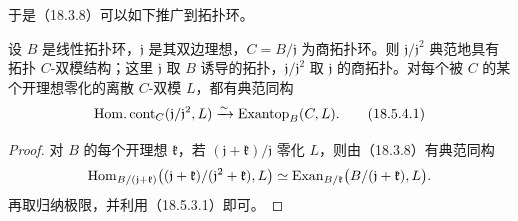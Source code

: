 于是（18.3.8）可以如下推广到拓扑环。

设 $B$ 是线性拓扑环，$\mathfrak j$ 是其双边理想，$C=B/\mathfrak j$ 为商拓扑环。则 $\mathfrak j/\mathfrak j^2$ 典范地具有拓扑 $C$-双模结构；这里 $\mathfrak j$ 取 $B$ 诱导的拓扑，$\mathfrak j/\mathfrak j^2$ 取 $\mathfrak j$ 的商拓扑。对每个被 $C$ 的某个开理想零化的离散 $C$-双模 $L$，都有典范同构
\begin{equation}
 \operatorname{Hom.cont}_C(\mathfrak j/\mathfrak j^2,L)
 \xrightarrow{\sim}\operatorname{Exantop}_B(C,L).
 \tag{18.5.4.1}
\end{equation}
\begin{proof}
对 $B$ 的每个开理想 $\mathfrak k$，若 $(\mathfrak j+\mathfrak k)/\mathfrak j$ 零化 $L$，则由（18.3.8）有典范同构
\[
 \operatorname{Hom}_{B/(\mathfrak j+\mathfrak k)}
 \bigl((\mathfrak j+\mathfrak k)/(\mathfrak j^2+\mathfrak k),L\bigr)
 \simeq
 \operatorname{Exan}_{B/\mathfrak k}\bigl(B/(\mathfrak j+\mathfrak k),L\bigr).
\]
再取归纳极限，并利用（18.5.3.1）即可。
\end{proof}
